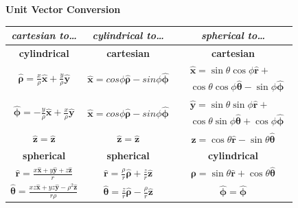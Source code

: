 \documentclass[letterpaper,landscape,10pt]{article}
\begin{document}
{\begin{multicols}{4}
\begin{center}
	\begin{minipage}{\columnwidth}
	  \centering \textbf{Unit Vector Conversion}\\
	\vspace{2.5pt}
	\begin{tabular}{ @{}c@{} !{\color{black}\vline} c !{\color{black}\vline} @{}c@{} }
		\textit{cartesian to\dots} & \textit{cylindrical to\dots} &
			\textit{spherical to\dots} \\
		\hline
		\textbf{cylindrical}    & \textbf{cartesian} & \textbf{cartesian} \\
		\hline
		$ \bm{\hat{\rho}} = \frac{x}{\rho}\bm{\hat{x}} +
				\frac{y}{\rho}\bm{\hat{y}} $ &
		$ \bm{\hat{x}} = cos\phi\bm{\hat{\rho}} - sin\phi\bm{\hat{\phi}} $ &
			\parbox[h][][c]{.35\columnwidth}{
			\begin{equation*}\begin{split}
				&\bm{\hat{x}} =
					\sin\theta\cos\phi\bm{\hat{r}} + \\
					&\cos\theta\cos\phi\bm{\hat{\theta}} -
					\sin\phi\bm{\hat{\phi}}
			\end{split}\end{equation*} } \\
		$ \bm{\hat{\phi}} = -\frac{y}{\rho}\bm{\hat{x}} + 
			\frac{x}{\rho}\bm{\hat{y}} $ &
		$ \bm{\hat{x}}=cos\phi\bm{\hat{\rho}}-sin\phi\bm{\hat{\phi}} $ &
		\parbox[h][][c]{.35\columnwidth}{
			\begin{equation*}\begin{split}
				&\bm{\hat{y}} = \sin\theta\sin\phi\bm{\hat{r}} + \\
					&\cos\theta\sin\phi\bm{\hat{\theta}} +
					\cos\phi\bm{\hat{\phi}}
				\end{split}\end{equation*} } \\
		$ \bm{\hat{z}} = \bm{\hat{z}} $ &
		$ \bm{\hat{z}} = \bm{\hat{z}} $ &
		$ \bm{\hat{z}} = \cos\theta\bm{\hat{r}}-\sin\theta\bm{\hat{\theta}} $\\

		\hline
		\textbf{spherical}      & \textbf{spherical} & \textbf{cylindrical} \\
		\hline

		$ \bm{\hat{r}} = \frac{x\bm{\hat{x}} + y\bm{\hat{y}} +
			z\bm{\hat{z}}}{r} $ &
		$ \bm{\hat{r}} = \frac{\rho}{r}\bm{\hat{\rho}} + 
			\frac{z}{r}\bm{\hat{z}} $ &
		$ \bm{\hat{\rho}} = \sin\theta\bm{\hat{r}} +
			\cos\theta\bm{\hat{\theta}} $ \\

		$ \bm{\hat{\theta}} = \frac{xz\bm{\hat{x}} + yz\bm{\hat{y}} -
			\rho^2\bm{\hat{z}}} {r\rho} $ &
		$ \bm{\hat{\theta}} = \frac{z}{r}\bm{\hat{\rho}} -
			\frac{\rho}{r}\bm{\hat{z}} $ &
		$ \bm{\hat{\phi}} = \bm{\hat{\phi}} $ \\


\end{tabular}
\end{minipage}
\end{center}
\end{multicols}}
\end{document}

